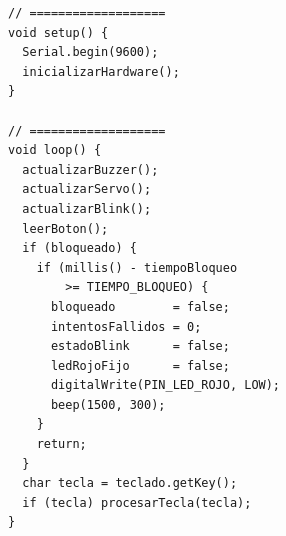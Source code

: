 \begin{lstlisting}[caption={Implementación de Control de Acceso con Teclado y Servo}, label={lst:control-acceso}]
// ===================
void setup() {
  Serial.begin(9600);
  inicializarHardware();
}

// ===================
void loop() {
  actualizarBuzzer();
  actualizarServo();
  actualizarBlink();
  leerBoton();
  if (bloqueado) {
    if (millis() - tiempoBloqueo
        >= TIEMPO_BLOQUEO) {
      bloqueado        = false;
      intentosFallidos = 0;
      estadoBlink      = false;
      ledRojoFijo      = false;
      digitalWrite(PIN_LED_ROJO, LOW);
      beep(1500, 300);
    }
    return;
  }
  char tecla = teclado.getKey();
  if (tecla) procesarTecla(tecla);
}
\end{lstlisting}